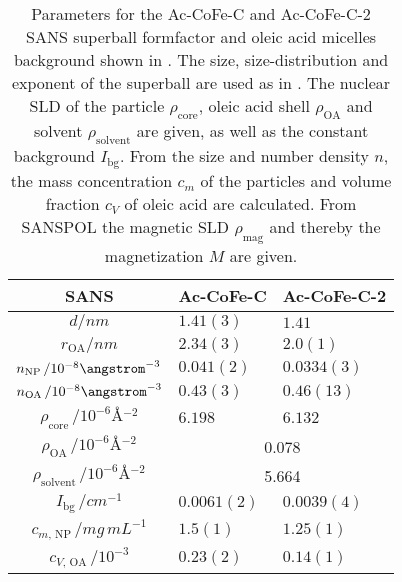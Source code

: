 \documentclass[\main/dresen_thesis.tex]{subfiles}
\begin{document}
    \begin{table}[!htbp]
      \centering
      \caption{\label{tab:monolayers:nanoparticle:sans:superballAcAcFit}Parameters for the Ac-CoFe-C and Ac-CoFe-C-2 SANS superball formfactor and oleic acid micelles background shown in .
      The size, size-distribution and exponent of the superball are used as in .
      The nuclear SLD of the particle $\rho_\mathrm{core}$, oleic acid shell $\rho_\mathrm{OA}$ and solvent $\rho_\mathrm{solvent}$ are given, as well as the constant background $I_\mathrm{bg}$. From the size and number density $n$, the mass concentration $c_m$ of the particles and volume fraction $c_V$ of oleic acid are calculated. From SANSPOL the magnetic SLD $\rho_\mathrm{mag}$ and thereby the magnetization $M$ are given.}
      \begin{tabular}{ c | l | l }
        \textbf{SANS}  & \textbf{Ac-CoFe-C} & \textbf{Ac-CoFe-C-2}\\
        \hline
        \rule{0pt}{2ex} $d / \unit{nm}$                                              & $1.41(3)$      & $1.41$  \\
        \rule{0pt}{2ex} $r_\mathrm{OA} / \unit{nm}$                                  & $2.34(3)$      & $2.0(1)$  \\
        \rule{0pt}{2ex} $n_\mathrm{NP} \, / 10^{-8} \angstrom^{-3}$                  & $0.041(2)$     & $0.0334(3)$ \\
        \rule{0pt}{2ex} $n_\mathrm{OA} \, / 10^{-8} \angstrom^{-3}$                  & $0.43(3)$      & $0.46(13)$  \\
        \hline
        \rule{0pt}{2ex} $\rho_\mathrm{core}    \, / \unit{10^{-6} \angstrom^{-2}}$   & $6.198$        & $6.132$    \\
        \hline
        \rule{0pt}{2ex} $\rho_\mathrm{OA}      \, / \unit{10^{-6} \angstrom^{-2}}$   & \multicolumn{2}{c}{0.078}\\
        \rule{0pt}{2ex} $\rho_\mathrm{solvent} \, / \unit{10^{-6} \angstrom^{-2}}$   & \multicolumn{2}{c}{5.664}\\
        \hline
        \rule{0pt}{2ex} $I_\mathrm{bg} \, / \unit{cm^{-1}}$                          & $0.0061(2)$    & $0.0039(4)$\\
        \hline
        \rule{0pt}{2ex} $c_{m, \, \mathrm{NP}} \, / \unit{mg\, mL^{-1}}$             & $1.5(1)$       & $1.25(1)$  \\
        \rule{0pt}{2ex} $c_{V, \, \mathrm{OA}} \, / \unit{10^{-3}}$                  & $0.23(2)$      & $0.14(1)$  \\

\end{tabular}
\end{table}
\end{document}
